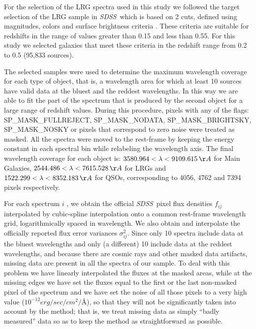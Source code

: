 \documentclass[12pt,preprint]{aastex}
\newcommand{\project}[1]{\textsl{#1}}
\newcommand{\sdss}{\project{SDSS}}
\newcommand{\SDSS}{\sdss}
\begin{document}
For the selection of the LRG spectra used in this study we followed the
target selection of the LRG sample in \SDSS\ which is based on 2 cuts,
defined using magnitudes, colors and surface brightness criteria
\citep{eisenstein}. These criteria are suitable for
redshifts in the range of values greater than 0.15 and less than 0.55. For 
this study we selected galaxies that meet these criteria in the redshift range 
from 0.2 to 0.5 (95,833 sources). 

The selected samples were used to determine the maximum wavelength coverage 
for each type of object, that
is, a wavelength area for which at least 10 sources have valid data at
the bluest and the reddest wavelengths. In this way we are able to
fit the part of the spectrum that is produced by the second object for
a large range of redshift values. During this procedure, pixels with
any of the flags: SP\_MASK\_FULLREJECT, SP\_MASK\_NODATA,
SP\_MASK\_BRIGHTSKY, SP\_MASK\_NOSKY or pixels that correspond to zero
noise were treated as masked. All the spectra were
moved to the rest-frame by keeping the energy constant in each
spectral bin while relabeling the wavelength axis.  The final
wavelength coverage for each object is:
$3580.964<\lambda<9109.615\,\AA$ for Main Galaxies,
$2544.486<\lambda<7615.528\,\AA$ for LRGs and
$1522.299<\lambda<8352.183\,\AA$ for QSOs, corresponding to 4056, 4762
and 7394 pixels respectively.

For each spectrum $i$ , we obtain the official \SDSS\ pixel flux densities $f_{ij}$
interpolated by cubic-spline interpolation onto a common rest-frame
wavelength grid, logarithmically spaced in wavelength.  We also obtain
and interpolate the officially reported flux error variances
$\sigma_{ij}^2$.  Since only 10 spectra include data at the bluest
wavelengths and only (a different) 10 include data at the reddest
wavelengths, and because there are cosmic rays and other masked data
artifacts, missing data are present in all the spectra of our
sample. To deal with this problem we have linearly interpolated the 
fluxes at the masked areas, while at the missing edges we have set the fluxes 
equal to the first or the last non-masked pixel of the spectrum and 
we have set the noise of all those pixels to a very high value
($10^{-12} erg/sec/cm^2/$\AA), so that they will not be significantly
taken into account by the method; that is, we treat missing data as
simply ``badly measured'' data so as to keep the method as
straightforward as possible.
\end{document}
